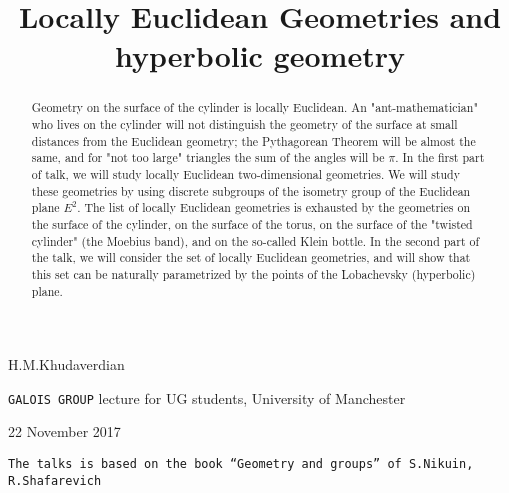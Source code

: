 \documentclass[12pt]{article}
\title{Locally Euclidean Geometries and hyperbolic geometry}
\date{}
\theoremstyle{definition}
\numberwithin{equation}{section}
\begin{document}
\maketitle




\def\vare {\varepsilon}
\def\AA {{\bf A}}
\def\A {{\cal A}}
\def\t {\tilde}
\def\bs {{\bf s}}
\def\a {\alpha}
\def\d {\delta}
\def\K {{\bf K}}
\def\N {{\bf N}}
\def\w {\omega}
\def\s {{\sigma}}
\def\S {{\Sigma}}
\def\s {{\sigma}}
\def\p{\partial}
\def\vare{{\varepsilon}}
\def\Q {{\bf Q}}
\def\D {{\cal D}}
\def\B {{\cal B}}
\def\G {{\Gamma}}
\def\C {{\bf C}}
\def\R {{\bf R}}
\def\L {{\cal L}}
\def\F {{\cal F}}
\def\Z {{\bf Z}}
\def\U  {{\cal U}}
\def\H {{\bf H}}
\def\S  {{\bf S}}
\def\E  {{\bf E}}
\def\l {\lambda}
\def\degree {{\bf {\rm degree}\,\,}}
\def \finish {${\,\,\vrule height1mm depth2mm width 8pt}$}
\def \m {\medskip}
\def\p {\partial}
\def\r {{\bf r}}
\def\pt {{\bf pt}}
\def\v {{\bf v}}
\def\n {{\bf n}}
\def\t {{\bf t}}
\def\b {{\bf b}}
\def\c {{\bf c }}
\def\e{{\bf e}}
\def\ac {{\bf a}}
\def \X   {{\bf X}}
\def \Y   {{\bf Y}}
\def \x   {{\bf x}}
\def \y   {{\bf y}}
\def\ss  {\sigma_{\rm sph}}
\def \grad {{\rm grad\,}}
\def\e {{\bf e}}
\def\f {{\bf f}}
\def\g {{\bf g}}




  \centerline {H.M.Khudaverdian}

\m

\centerline {{\tt GALOIS GROUP} lecture for UG students, 
             University of Manchester}


\m

     \centerline {22 November 2017}

\m

{\tt The talks is based on the book 
``Geometry and groups'' of 
S.Nikuin, R.Shafarevich}

\medskip

\begin{abstract}


Geometry on the surface of the cylinder is 
locally Euclidean. An "ant-mathematician" who lives 
on the cylinder will not  distinguish the geometry of  
the surface at small distances from the Euclidean  
geometry; the Pythagorean Theorem will be almost the same, 
and for "not too large" triangles the sum of the angles will
 be $\pi$.
      In the first part of talk, we will study locally 
Euclidean two-dimensional geometries. We will study  
these geometries by using discrete subgroups of the 
isometry group of the Euclidean 
plane $E^2$. The list of locally Euclidean geometries is 
exhausted by the geometries  on the surface of the cylinder, 
on the surface of the torus, on the surface of the 
"twisted cylinder" (the Moebius band), 
and on the so-called Klein bottle.
         In the second part of the talk, we will 
consider the set of locally Euclidean  geometries, 
and will show that this set can be naturally 
parametrized by the points of the Lobachevsky 
(hyperbolic) plane.


\end{abstract}
\end{document}
